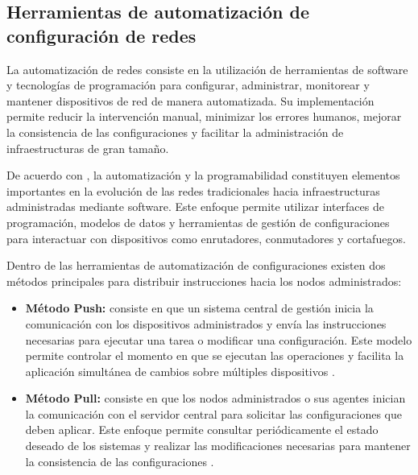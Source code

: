 \documentclass[12pt,a4paper]{article}
\begin{document}

\subsection{Herramientas de automatización de configuración de redes}
\label{sec:herramientas_automatizacion}

La automatización de redes consiste en la utilización de herramientas
de software y tecnologías de programación para configurar, administrar,
monitorear y mantener dispositivos de red de manera automatizada.
Su implementación permite reducir la intervención manual, minimizar
los errores humanos, mejorar la consistencia de las configuraciones
y facilitar la administración de infraestructuras de gran tamaño.

De acuerdo con \textcite{edelman2018network}, la automatización y la
programabilidad constituyen elementos importantes en la evolución de
las redes tradicionales hacia infraestructuras administradas mediante
software. Este enfoque permite utilizar interfaces de programación,
modelos de datos y herramientas de gestión de configuraciones para
interactuar con dispositivos como enrutadores, conmutadores y
cortafuegos.

Dentro de las herramientas de automatización de configuraciones
existen dos métodos principales para distribuir instrucciones hacia
los nodos administrados:

\begin{itemize}

    \item \textbf{Método Push:} consiste en que un sistema central
    de gestión inicia la comunicación con los dispositivos
    administrados y envía las instrucciones necesarias para
    ejecutar una tarea o modificar una configuración. Este modelo
    permite controlar el momento en que se ejecutan las operaciones
    y facilita la aplicación simultánea de cambios sobre múltiples
    dispositivos \parencite{geerling2020ansible}.

    \item \textbf{Método Pull:} consiste en que los nodos
    administrados o sus agentes inician la comunicación con el
    servidor central para solicitar las configuraciones que deben
    aplicar. Este enfoque permite consultar periódicamente el
    estado deseado de los sistemas y realizar las modificaciones
    necesarias para mantener la consistencia de las configuraciones
    \parencite{puppet_documentation}.

\end{itemize}
\end{document}
